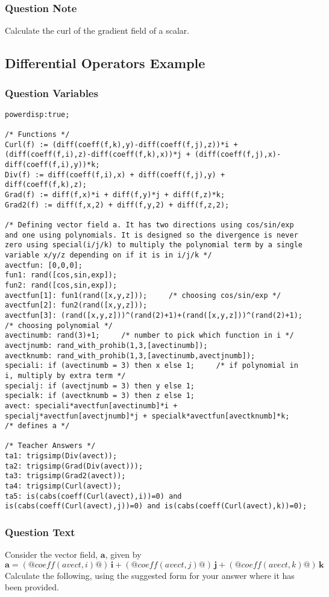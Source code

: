 \documentclass[a4paper,10pt]{article}
\begin{document}
\subsubsection{Question Note}
Calculate the curl of the gradient field of a scalar.

\subsection{Differential Operators Example}
\subsubsection{Question Variables}
\begin{lstlisting}
powerdisp:true;

/* Functions */
Curl(f) := (diff(coeff(f,k),y)-diff(coeff(f,j),z))*i + (diff(coeff(f,i),z)-diff(coeff(f,k),x))*j + (diff(coeff(f,j),x)-diff(coeff(f,i),y))*k;
Div(f) := diff(coeff(f,i),x) + diff(coeff(f,j),y) + diff(coeff(f,k),z);
Grad(f) := diff(f,x)*i + diff(f,y)*j + diff(f,z)*k;
Grad2(f) := diff(f,x,2) + diff(f,y,2) + diff(f,z,2);

/* Defining vector field a. It has two directions using cos/sin/exp and one using polynomials. It is designed so the divergence is never zero using special(i/j/k) to multiply the polynomial term by a single variable x/y/z depending on if it is in i/j/k */
avectfun: [0,0,0];
fun1: rand([cos,sin,exp]);
fun2: rand([cos,sin,exp]);
avectfun[1]: fun1(rand([x,y,z]));     /* choosing cos/sin/exp */
avectfun[2]: fun2(rand([x,y,z]));
avectfun[3]: (rand([x,y,z]))^(rand(2)+1)+(rand([x,y,z]))^(rand(2)+1);     /* choosing polynomial */
avectinumb: rand(3)+1;     /* number to pick which function in i */
avectjnumb: rand_with_prohib(1,3,[avectinumb]);
avectknumb: rand_with_prohib(1,3,[avectinumb,avectjnumb]);
speciali: if (avectinumb = 3) then x else 1;     /* if polynomial in i, multiply by extra term */
specialj: if (avectjnumb = 3) then y else 1;
specialk: if (avectknumb = 3) then z else 1;
avect: speciali*avectfun[avectinumb]*i + specialj*avectfun[avectjnumb]*j + specialk*avectfun[avectknumb]*k;     /* defines a */

/* Teacher Answers */
ta1: trigsimp(Div(avect));
ta2: trigsimp(Grad(Div(avect)));
ta3: trigsimp(Grad2(avect));
ta4: trigsimp(Curl(avect));
ta5: is(cabs(coeff(Curl(avect),i))=0) and is(cabs(coeff(Curl(avect),j))=0) and is(cabs(coeff(Curl(avect),k))=0);
\end{lstlisting}
\subsubsection{Question Text}
Consider the vector field, \(\mathbf{a}\), given by \[ \mathbf{a} = \left(@coeff(avect,i)@\right) \, \mathbf{i}+\left(@coeff(avect,j)@\right) \, \mathbf{j}+ \left(@coeff(avect,k)@\right) \, \mathbf{k}\]Calculate the following, using the suggested form for your answer where it has been provided.
\end{document}
